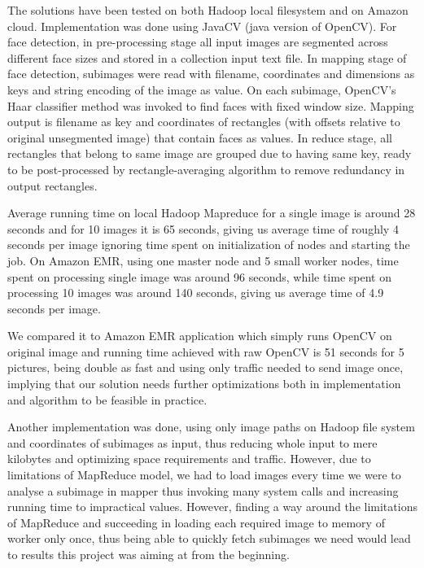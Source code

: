 \documentclass[11pt, draftclsnofoot, onecolumn]{IEEEtran}
\begin{document}
The solutions have been tested on both Hadoop local filesystem and on Amazon cloud. Implementation was done using JavaCV (java version of OpenCV). For face detection, in pre-processing stage all input images are segmented across different face sizes and stored in a collection input text file. In mapping stage of face detection, subimages were read with filename, coordinates and dimensions as keys and string encoding of the image as value. On each subimage, OpenCV's Haar classifier method was invoked to find faces with fixed window size. Mapping output is filename as key and coordinates of rectangles (with offsets relative to original unsegmented image) that contain faces as values. In reduce stage, all rectangles that belong to same image are grouped due to having same key, ready to be post-processed by rectangle-averaging algorithm to remove redundancy in output rectangles.

Average running time on local Hadoop Mapreduce for a single image is around 28 seconds and for 10 images it is 65 seconds, giving us average time of roughly 4 seconds per image ignoring time spent on initialization of nodes and starting the job. On Amazon EMR, using one master node and 5 small worker nodes, time spent on processing single image was around 96 seconds, while time spent on processing 10 images was around 140 seconds, giving us average time of 4.9 seconds per image.

We compared it to Amazon EMR application which simply runs OpenCV on original image and running time achieved with raw OpenCV is 51 seconds for 5 pictures, being double as fast and using only traffic needed to send image once, implying that our solution needs further optimizations both in implementation and algorithm to be feasible in practice.

Another implementation was done, using only image paths on Hadoop file system and coordinates of subimages as input, thus reducing whole input to mere kilobytes and optimizing space requirements and traffic. However, due to limitations of MapReduce model, we had to load images every time we were to analyse a subimage in mapper thus invoking many system calls and increasing running time to impractical values. However, finding a way around the limitations of MapReduce and succeeding in loading each required image to memory of worker only once, thus being able to quickly fetch subimages we need would lead to results this project was aiming at from the beginning.
\end{document}
